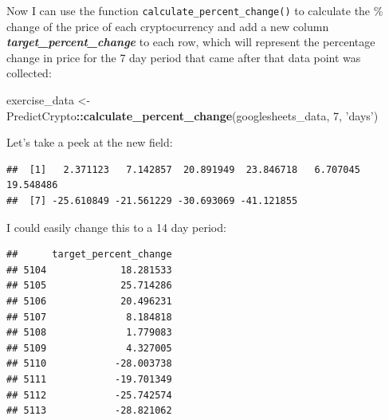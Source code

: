 \documentclass[
]{book}
\newenvironment{Shaded}{\begin{snugshade}}{\end{snugshade}}
\newcommand{\DecValTok}[1]{\textcolor[rgb]{0.00,0.00,0.81}{#1}}
\newcommand{\KeywordTok}[1]{\textcolor[rgb]{0.13,0.29,0.53}{\textbf{#1}}}
\newcommand{\NormalTok}[1]{#1}
\newcommand{\OperatorTok}[1]{\textcolor[rgb]{0.81,0.36,0.00}{\textbf{#1}}}
\newcommand{\StringTok}[1]{\textcolor[rgb]{0.31,0.60,0.02}{#1}}
\begin{document}
Now I can use the function \texttt{calculate\_percent\_change()} to calculate the \% change of the price of each cryptocurrency and add a new column \textbf{\emph{target\_percent\_change}} to each row, which will represent the percentage change in price for the 7 day period that came after that data point was collected:

\begin{Shaded}
\begin{Highlighting}[]
\NormalTok{exercise_data <-}\StringTok{ }\NormalTok{PredictCrypto}\OperatorTok{::}\KeywordTok{calculate_percent_change}\NormalTok{(googlesheets_data, }\DecValTok{7}\NormalTok{, }\StringTok{'days'}\NormalTok{)}
\end{Highlighting}
\end{Shaded}

Let's take a peek at the new field:

\begin{Shaded}
\end{Shaded}

\begin{verbatim}
##  [1]   2.371123   7.142857  20.891949  23.846718   6.707045  19.548486
##  [7] -25.610849 -21.561229 -30.693069 -41.121855
\end{verbatim}

I could easily change this to a 14 day period:

\begin{Shaded}
\end{Shaded}

\begin{verbatim}
##      target_percent_change
## 5104             18.281533
## 5105             25.714286
## 5106             20.496231
## 5107              8.184818
## 5108              1.779083
## 5109              4.327005
## 5110            -28.003738
## 5111            -19.701349
## 5112            -25.742574
## 5113            -28.821062
\end{verbatim}
\end{document}
